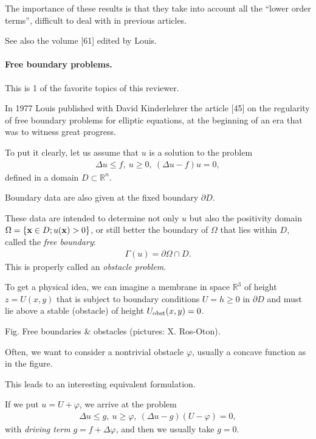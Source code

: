 \documentclass{article}
\begin{document}
The importance of these results is that they take into account all the ``lower order terms'', difficult to deal with in previous articles.

See also the volume [61] edited by Louis.

\paragraph{Free boundary problems.} This is 1 of the favorite topics of this reviewer.

In 1977 Louis published with David Kinderlehrer the article [45] on the regularity of free boundary problems for elliptic equations, at the beginning of an era that was to witness great progress.

To put it clearly, let us assume that $u$ is a solution to the problem
\begin{align*}
	\Delta u\le f,\ u\ge 0,\ (\Delta u - f)u = 0,
\end{align*}
defined in a domain $D\subset\mathbb{R}^n$.

Boundary data are also given at the fixed boundary $\partial D$.

These data are intended to determine not only $u$ but also the positivity domain $\Omega = \{{\bf x}\in D;u({\bf x}) > 0\}$, or still better the boundary of $\Omega$ that lies within $D$, called the \textit{free boundary}:
\begin{align*}
	\Gamma(u) = \partial\Omega\cap D.
\end{align*}
This is properly called an \textit{obstacle problem}.

To get a physical idea, we can imagine a membrane in space $\mathbb{R}^3$ of height $z = U(x,y)$ that is subject to boundary conditions $U = h\ge 0$ in $\partial D$ and must lie above a stable (obstacle) of height $U_{\rm obst}(x,y) = 0$.

\textsf{Fig. Free boundaries \& obstacles (pictures: X. Ros-Oton).}

%
Often, we want to consider a nontrivial obstacle $\varphi$, usually a concave function as in the figure.

This leads to an interesting equivalent formulation.

If we put $u = U + \varphi$, we arrive at the problem
\begin{align*}
	\Delta u\le g,\ u\ge\varphi,\ (\Delta u - g)(U - \varphi) = 0,
\end{align*}
with \textit{driving term} $g = f + \Delta\varphi$, and then we usually take $g = 0$.
\end{document}
